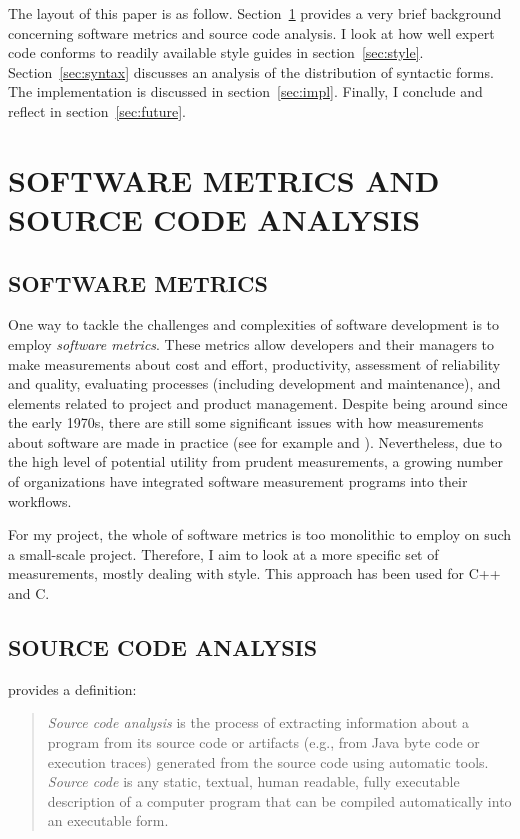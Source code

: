 \documentclass[12pt,abstracton]{scrartcl}
\begin{document}
The layout of this paper is as follow.
Section~\ref{sec:metric} provides a very brief background
concerning software metrics and source code analysis.
I look at how well expert code conforms to readily available
style guides in section~\ref{sec:style}.
Section~\ref{sec:syntax} discusses an analysis
of the distribution of syntactic forms. The implementation is discussed
in section~\ref{sec:impl}. Finally, I conclude and reflect in section~\ref{sec:future}.
\section{SOFTWARE METRICS AND SOURCE CODE ANALYSIS}\label{sec:metric}
\subsection{SOFTWARE METRICS}
One way to tackle the challenges and complexities of software development is to employ
\emph{software metrics}. These metrics allow developers and their managers to make
measurements about cost and effort, productivity, assessment of reliability and
quality, evaluating processes (including development and maintenance), and elements
related to project and product management.\cite{Ord08} Despite being around since
the early 1970s, there are still some significant issues with how measurements
about software are made in practice (see for example \cite{Jon94} and \cite{Bou12}).
Nevertheless, due to the high level of potential utility from prudent measurements,
a growing number of organizations have integrated software measurement programs into
their workflows.\cite{Ord08}

For my project, the whole of software metrics is too monolithic to employ on
such a small-scale project. Therefore, I aim to look at a more specific set of measurements,
mostly dealing with style. This approach has been used for C++\cite{Aye98} and C\cite{Tak11}.
\subsection{SOURCE CODE ANALYSIS}
\cite{Bin07} provides a definition:
\begin{quote}
\emph{Source code analysis} is the process of extracting
information about a program from its source code
or artifacts (e.g., from Java byte code or execution
traces) generated from the source code using automatic tools.
\emph{Source code} is any static, textual,
human readable, fully executable description of
a computer program that can be compiled automatically into an executable form.
\end{quote}
\end{document}

